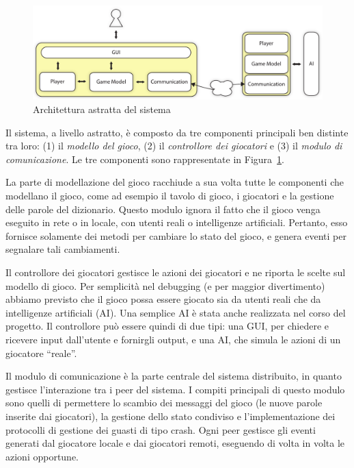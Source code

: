 \documentclass[10.5pt]{article}
\begin{document}
\begin{figure}
\centering
\includegraphics[scale=0.6]{imgs/ArchitetturaAstratta.pdf}
\caption{Architettura astratta del sistema}
\label{img:architettura-astratta}
\end{figure}

Il sistema, a livello astratto, è composto da tre componenti principali ben distinte tra loro: (1) il \emph{modello del gioco}, (2) il \emph{controllore dei giocatori} e (3) il \emph{modulo di comunicazione}. Le tre componenti sono rappresentate in Figura~\ref{img:architettura-astratta}.

La parte di modellazione del gioco racchiude a sua volta tutte le componenti che modellano il gioco, come ad esempio il tavolo di gioco, i giocatori e la gestione delle parole del dizionario.
Questo modulo ignora il fatto che il gioco venga eseguito in rete o in locale, con utenti reali o intelligenze artificiali.
Pertanto, esso fornisce solamente dei metodi per cambiare lo stato del gioco, e genera eventi per segnalare tali cambiamenti.

Il controllore dei giocatori gestisce le azioni dei giocatori e ne riporta le scelte sul modello di gioco. Per semplicità nel debugging (e per maggior divertimento) abbiamo previsto che il gioco possa essere giocato sia da utenti reali che da intelligenze artificiali (AI). Una semplice AI è stata anche realizzata nel corso del progetto. Il controllore può essere quindi di due tipi: una GUI, per chiedere e ricevere input dall'utente e fornirgli output, e una AI, che simula le azioni di un giocatore ``reale''.

Il modulo di comunicazione è la parte centrale del sistema distribuito, in quanto gestisce l'interazione tra i peer del sistema. I compiti principali di questo modulo sono quelli di permettere lo scambio dei messaggi del gioco (le nuove parole inserite dai giocatori), la gestione dello stato condiviso e l'implementazione dei protocolli di gestione dei guasti di tipo crash.
Ogni peer gestisce gli eventi generati dal giocatore locale e dai giocatori remoti, eseguendo di volta in volta le azioni opportune.
\end{document}
